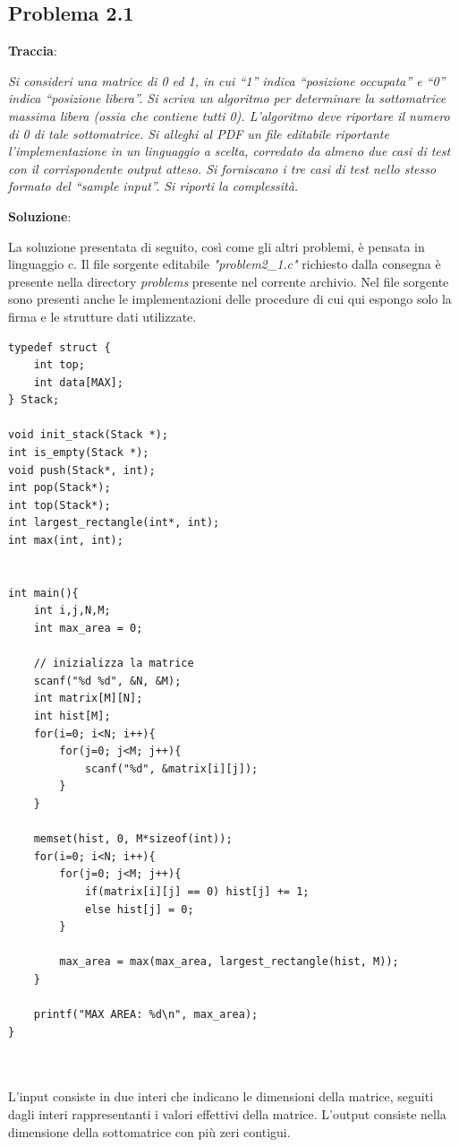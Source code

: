 \documentclass{article}
\begin{document}
\subsection{Problema 2.1} \label{subsec:problema_2_1}
\textbf{Traccia}:

\noindent
\textit{Si consideri una matrice di 0 ed 1, in cui “1” indica “posizione occupata” e “0” indica “posizione libera”. Si scriva un algoritmo per determinare la sottomatrice massima libera (ossia che contiene tutti 0). L'algoritmo deve riportare il numero di 0 di tale sottomatrice.
Si alleghi al PDF un file editabile riportante l'implementazione in un linguaggio a scelta, corredato da almeno due casi di test con il corrispondente output atteso. Si forniscano i tre casi di test nello stesso formato del “sample input”. Si riporti la complessità.
}

\vspace{2\baselineskip}
\noindent
\textbf{Soluzione}: 

\noindent
La soluzione presentata di seguito, così come gli altri problemi, è pensata in linguaggio c. Il file sorgente editabile \textit{"problem2\_1.c"} richiesto dalla consegna è presente nella directory \textit{problems} presente nel corrente archivio. Nel file sorgente sono presenti anche le implementazioni delle procedure di cui qui espongo solo la firma e le strutture dati utilizzate.

\begin{lstlisting}
typedef struct {
    int top;
    int data[MAX];
} Stack;

void init_stack(Stack *);
int is_empty(Stack *);
void push(Stack*, int);
int pop(Stack*);
int top(Stack*);
int largest_rectangle(int*, int);
int max(int, int);


int main(){
    int i,j,N,M;
    int max_area = 0;

    // inizializza la matrice
    scanf("%d %d", &N, &M);
    int matrix[M][N];
    int hist[M];
    for(i=0; i<N; i++){
        for(j=0; j<M; j++){
            scanf("%d", &matrix[i][j]);
        }
    }

    memset(hist, 0, M*sizeof(int));
    for(i=0; i<N; i++){
        for(j=0; j<M; j++){
            if(matrix[i][j] == 0) hist[j] += 1;
            else hist[j] = 0;
        }

        max_area = max(max_area, largest_rectangle(hist, M));
    }

    printf("MAX AREA: %d\n", max_area);
}



\end{lstlisting}
\noindent
L'input  consiste in due interi che indicano le dimensioni della matrice, seguiti dagli interi rappresentanti i valori effettivi della matrice. L'output consiste nella dimensione della sottomatrice con più zeri contigui. 
\end{document}
